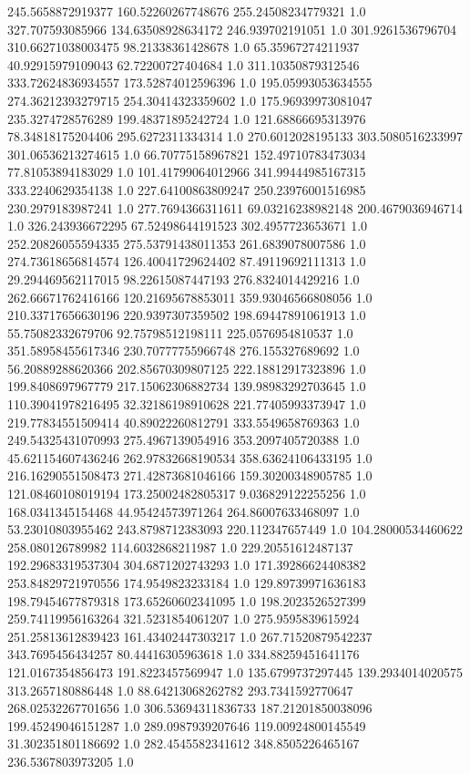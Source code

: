 245.5658872919377	160.52260267748676	255.24508234779321	1.0
327.707593085966	134.63508928634172	246.939702191051	1.0
301.9261536796704	310.66271038003475	98.21338361428678	1.0
65.35967274211937	40.92915979109043	62.72200727404684	1.0
311.10350879312546	333.72624836934557	173.52874012596396	1.0
195.05993053634555	274.36212393279715	254.30414323359602	1.0
175.96939973081047	235.3274728576289	199.48371895242724	1.0
121.68866695313976	78.34818175204406	295.6272311334314	1.0
270.6012028195133	303.5080516233997	301.06536213274615	1.0
66.70775158967821	152.49710783473034	77.81053894183029	1.0
101.41799064012966	341.99444985167315	333.2240629354138	1.0
227.64100863809247	250.23976001516985	230.2979183987241	1.0
277.7694366311611	69.03216238982148	200.4679036946714	1.0
326.243936672295	67.52498644191523	302.4957723653671	1.0
252.20826055594335	275.53791438011353	261.6839078007586	1.0
274.73618656814574	126.40041729624402	87.49119692111313	1.0
29.294469562117015	98.22615087447193	276.8324014429216	1.0
262.66671762416166	120.21695678853011	359.93046566808056	1.0
210.33717656630196	220.9397307359502	198.69447891061913	1.0
55.75082332679706	92.75798512198111	225.0576954810537	1.0
351.58958455617346	230.70777755966748	276.155327689692	1.0
56.20889288620366	202.85670309807125	222.18812917323896	1.0
199.8408697967779	217.15062306882734	139.98983292703645	1.0
110.39041978216495	32.32186198910628	221.77405993373947	1.0
219.77834551509414	40.89022260812791	333.5549658769363	1.0
249.54325431070993	275.4967139054916	353.2097405720388	1.0
45.621154607436246	262.97832668190534	358.63624106433195	1.0
216.16290551508473	271.42873681046166	159.30200348905785	1.0
121.08460108019194	173.25002482805317	9.036829122255256	1.0
168.0341345154468	44.95424573971264	264.86007633468097	1.0
53.23010803955462	243.8798712383093	220.112347657449	1.0
104.28000534460622	258.080126789982	114.6032868211987	1.0
229.20551612487137	192.29683319537304	304.6871202743293	1.0
171.39286624408382	253.84829721970556	174.9549823233184	1.0
129.89739971636183	198.79454677879318	173.65260602341095	1.0
198.2023526527399	259.74119956163264	321.5231854061207	1.0
275.9595839615924	251.25813612839423	161.43402447303217	1.0
267.71520879542237	343.7695456434257	80.44416305963618	1.0
334.88259451641176	121.0167354856473	191.8223457569947	1.0
135.6799737297445	139.2934014020575	313.2657180886448	1.0
88.64213068262782	293.7341592770647	268.02532267701656	1.0
306.53694311836733	187.21201850038096	199.45249046151287	1.0
289.0987939207646	119.00924800145549	31.302351801186692	1.0
282.4545582341612	348.8505226465167	236.5367803973205	1.0

